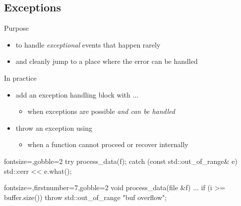 \subsection[except]{Exceptions}

\begin{frame}[fragile]
  \begin{block}{Purpose}
    \begin{itemize}
      \item to handle \textit{exceptional} events that happen rarely
      \item and cleanly jump to a place where the error can be handled
    \end{itemize}
  \end{block}
  \begin{block}{In practice}
    \begin{itemize}
      \item add an exception handling block with  ... 
      \begin{itemize}
        \item when exceptions are possible \textit{and can be handled}
      \end{itemize}
      \item throw an exception using 
      \begin{itemize}
        \item when a function cannot proceed or recover internally
      \end{itemize}
    \end{itemize}
  \end{block}
  \begin{multicols}{2}
    \begin{cppcode*}{fontsize=\small,gobble=2}
      try {
        process_data(f);
      } catch (const
        std::out_of_range& e) {
        std::cerr << e.what();
      }
    \end{cppcode*}
    \columnbreak
    \begin{cppcode*}{fontsize=\small,firstnumber=7,gobble=2}
      void process_data(file &f) {
        ...
        if (i >= buffer.size())
          throw std::out_of_range{
            "buf overflow"};
      }
    \end{cppcode*}
  \end{multicols}
\end{frame}

